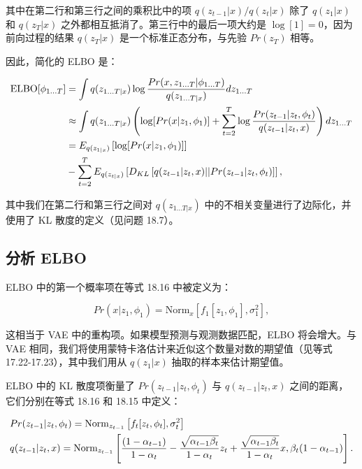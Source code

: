 \documentclass[lang=cn,newtx,10pt,scheme=chinese]{elegantbook}
\begin{document}
其中在第二行和第三行之间的乘积比中的项 \(q(z_{t-1}|x)/q(z_t|x)\) 除了 \(q(z_1|x)\) 和 \(q(z_T|x)\) 之外都相互抵消了。第三行中的最后一项大约是 \(\log[1] = 0\)，因为前向过程的结果 \(q(z_T|x)\) 是一个标准正态分布，与先验 \(Pr(z_T)\) 相等。

因此，简化的 ELBO 是：


\begin{align}
\text{ELBO}[\phi_{1...T}] &= \int q(z_{1...T|x}) \log \frac{Pr(x, z_{1...T}|\phi_{1...T})}{q(z_{1...T|x})} dz_{1...T} \notag \\
&\approx \int q(z_{1...T|x}) \left( \log [Pr(x|z_1, \phi_1)] + \sum_{t=2}^T \log \frac{Pr(z_{t-1}|z_t, \phi_t)}{q(z_{t-1}|z_t, x)} \right) dz_{1...T} \notag \\
&= E_{q(z_{1|x})} \left[ \log [Pr(x|z_1, \phi_1)] \right] \notag \\
&- \sum_{t=2}^T E_{q(z_{t|x})} \left[ D_{KL} \left[ q(z_{t-1}|z_t, x)||Pr(z_{t-1}|z_t, \phi_t) \right] \right],
\end{align}


其中我们在第二行和第三行之间对 \(q(z_{1...T|x})\) 中的不相关变量进行了边际化，并使用了 KL 散度的定义（见问题 18.7）。

\subsection{分析 ELBO}
ELBO 中的第一个概率项在等式 18.16 中被定义为：

\begin{equation}
Pr(x|z_1, \phi_1) = \text{Norm}_x \left[ f_1[z_1, \phi_1], \sigma^2_{1} \right], 
\end{equation}

这相当于 VAE 中的重构项。如果模型预测与观测数据匹配，ELBO 将会增大。与 VAE 相同，我们将使用蒙特卡洛估计来近似这个数量对数的期望值（见等式 17.22-17.23），其中我们用从 \(q(z_1|x)\) 抽取的样本来估计期望值。

ELBO 中的 KL 散度项衡量了 \(Pr(z_{t-1}|z_t, \phi_t)\) 与 \(q(z_{t-1}|z_t, x)\) 之间的距离，它们分别在等式 18.16 和 18.15 中定义：


\begin{align}
&Pr(z_{t-1}|z_t, \phi_t) = \text{Norm}_{z_{t-1}} \left[ f_t[z_t, \phi_t], \sigma^2_t \right] \notag \\
&q(z_{t-1}|z_t, x) = \text{Norm}_{z_{t-1}} \left[ \frac{(1 - \alpha_{t-1})}{1 - \alpha_t} - \frac{\sqrt{\alpha_{t-1}\beta_t}}{1 - \alpha_t} z_t + \frac{\sqrt{\alpha_{t-1}\beta_t}}{1 - \alpha_t} x, \beta_t(1 - \alpha_{t-1}) \right]. 
\end{align} 
\end{document}
